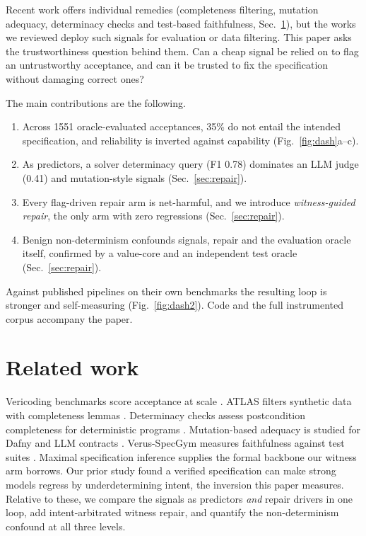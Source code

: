 \documentclass{esannV2}
\begin{document}
Recent work offers individual remedies (completeness filtering, mutation
adequacy, determinacy checks and test-based faithfulness, Sec.~\ref{sec:rw}), but
the works we reviewed deploy such signals for evaluation or data filtering. This
paper asks the trustworthiness question behind them. Can a cheap signal be relied
on to flag an untrustworthy acceptance, and can it be trusted to fix
the specification without damaging correct ones?

The main contributions are the following.
\begin{enumerate}\itemsep1pt\parskip0pt
\item Across 1551 oracle-evaluated acceptances, 35\% do not entail the intended
specification, and reliability is inverted against capability
(Fig.~\ref{fig:dash}a--c).
\item As predictors, a solver determinacy query (F1 0.78) dominates an LLM judge
(0.41) and mutation-style signals (Sec.~\ref{sec:repair}).
\item Every flag-driven repair arm is net-harmful, and we introduce
\emph{witness-guided repair}, the only arm with zero regressions (Sec.~\ref{sec:repair}).
\item Benign non-determinism confounds signals, repair and the evaluation oracle
itself, confirmed by a value-core and an independent test oracle
(Sec.~\ref{sec:repair}).
\end{enumerate}
Against published pipelines on their own benchmarks the resulting loop is
stronger and self-measuring (Fig.~\ref{fig:dash2}). Code and the full
instrumented corpus accompany the paper.

\section{Related work}
\label{sec:rw}

Vericoding benchmarks score acceptance at scale \cite{dafnybench,verina,%
vericoding}. ATLAS filters synthetic data with completeness lemmas \cite{atlas}.
Determinacy checks assess postcondition completeness for deterministic programs
\cite{sast26}. Mutation-based adequacy is studied for Dafny and LLM contracts
\cite{mutdafny,specharness}. Verus-SpecGym measures faithfulness against
test suites \cite{specgym}. Maximal specification inference \cite{maxspec}
supplies the formal backbone our witness arm borrows. Our prior study
\cite{mavcg} found a verified specification can make strong models regress by
underdetermining intent, the inversion this paper measures. Relative to these, we
compare the signals as predictors \emph{and} repair drivers in one loop, add
intent-arbitrated witness repair, and quantify the non-determinism confound at
all three levels.
\end{document}
